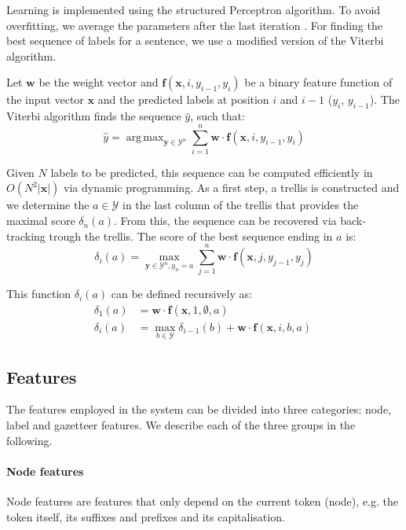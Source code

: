 \documentclass[11pt]{article}
\DeclareMathOperator*{\argmax}{arg\,max}
\begin{document}
Learning is implemented using the structured Perceptron algorithm. To avoid overfitting, we average the parameters after the last iteration \cite{collins2002discriminative}. 
For finding the best sequence of labels for a sentence, we use a modified version of the Viterbi algorithm. 

Let $\mathbf{w}$ be the weight vector and $\boldsymbol{f}(\mathbf{x}, i, y_{i-1}, y_{i})$  be a binary feature function of the input vector $\mathbf{x}$ and the predicted labels at position $i$ and ${i-1}$ ($y_{i}$, $y_{i-1}$). The Viterbi algorithm finds the sequence $\hat{y}$, such that:
\[
\hat{y} = \argmax_{\mathbf{y} \in \mathcal{Y}^{n}} \sum_{i=1}^{n}\mathbf{w} \cdot \boldsymbol{f}(\mathbf{x}, i, y_{i-1}, y_{i})
\]

Given $N$ labels to be predicted, this sequence can be computed efficiently in $ O( N^2 |\mathbf{x}| ) $ via dynamic programming. 
As a first step, a trellis is constructed and we determine the $ a \in \mathcal{Y}$ in the 
last column of the trellis that provides the maximal score $\delta_n(a)$. From this, the sequence can be recovered via back-tracking trough the trellis. 
The score of the best sequence ending in $a$ is:
\[
\delta_i(a) = \max_{\mathbf{y} \in \mathcal{Y}^{n}, y_n = a} \sum_{j=1}^{n}{\mathbf{w} \cdot \boldsymbol{f}(\mathbf{x}, j, y_{j-1}, y_{j})}
\]

\noindent This function $\delta_i(a)$ can be defined recursively as:
\begin{align*}
\delta_1(a) &= \mathbf{w} \cdot \boldsymbol{f}(\mathbf{x}, 1, \emptyset, a) \\
\delta_i(a) &= \max_{b \in \mathcal{Y}} \delta_{i-1}(b) + \mathbf{w} \cdot \boldsymbol{f}(\mathbf{x}, i, b, a) \
\end{align*}


\subsection{Features}
The features employed in the system can be divided into three categories: node, label and gazetteer features. 
We describe each of the three groups in the following.

\paragraph*{Node features}
Node features are features that only depend on the current token (node), e.g. the token itself, its suffixes and prefixes and its capitalisation.
\end{document}
